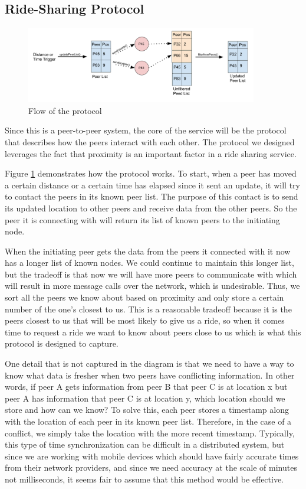 \documentclass[letterpaper,11pt,twocolumn]{article}
\begin{document}
\subsection{Ride-Sharing Protocol}

\begin{figure}[ht]
  \centering
   \includegraphics[width=0.9\textwidth]{images/protocol_diagram.png}     
  \caption{Flow of the protocol
           \label{design-diagram}}
\end{figure} 

Since this is a peer-to-peer system, the core of the service will be the protocol that describes how the peers interact with each other. The protocol we designed leverages the fact that proximity is an important factor in a ride sharing service. 

Figure \ref{design-diagram} demonstrates how the protocol works. To start, when a peer has moved a certain distance or a certain time has elapsed since it sent an update, it will try to contact the peers in its known peer list. The purpose of this contact is to send its updated location to other peers and receive data from the other peers. So the peer it is connecting with will return its list of known peers to the initiating node.


When the initiating peer gets the data from the peers it connected with it now has a longer list of known nodes. We could continue to maintain this longer list, but the tradeoff is that now we will have more peers to communicate with which will result in more message calls over the network, which is undesirable. Thus, we sort all the peers we know about based on proximity and only store a certain number of the one’s closest to us. This is a reasonable tradeoff because it is the peers closest to us that will be most likely to give us a ride, so when it comes time to request a ride we want to know about peers close to us which is what this protocol is designed to capture.

One detail that is not captured in the diagram is that we need to have a way to know what data is fresher when two peers have conflicting information. In other words, if peer A gets information from peer B that peer C is at location x but peer A has information that peer C is at location y, which location should we store and how can we know? To solve this, each peer stores a timestamp along with the location of each peer in its known peer list. Therefore, in the case of a conflict, we simply take the location with the more recent timestamp. Typically, this type of time synchronization can be difficult in a distributed system, but since we are working with mobile devices which should have fairly accurate times from their network providers, and since we need accuracy at the scale of minutes not milliseconds, it seems fair to assume that this method would be effective. 
\end{document}
